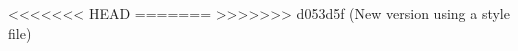 

<<<<<<< HEAD
\conditionalPageBreak
=======
\conditionalPageBreak{}
>>>>>>> d053d5f (New version using a style file)


